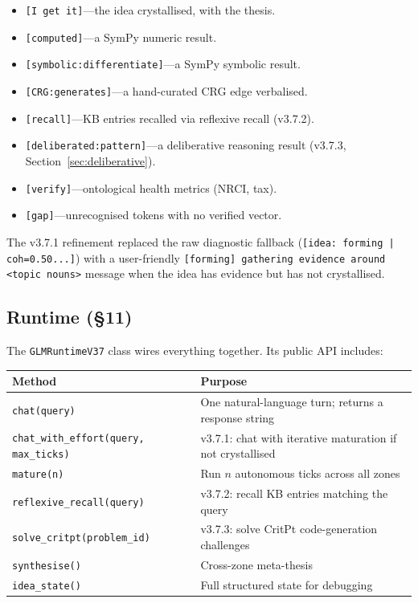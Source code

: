 \documentclass[11pt,a4paper]{article}
\begin{document}
\begin{itemize}
    \item \texttt{[I get it]}---the idea crystallised, with the thesis.
    \item \texttt{[computed]}---a SymPy numeric result.
    \item \texttt{[symbolic:differentiate]}---a SymPy symbolic result.
    \item \texttt{[CRG:generates]}---a hand-curated CRG edge verbalised.
    \item \texttt{[recall]}---KB entries recalled via reflexive recall (v3.7.2).
    \item \texttt{[deliberated:pattern]}---a deliberative reasoning result (v3.7.3, Section~\ref{sec:deliberative}).
    \item \texttt{[verify]}---ontological health metrics (NRCI, tax).
    \item \texttt{[gap]}---unrecognised tokens with no verified vector.
\end{itemize}

The v3.7.1 refinement replaced the raw diagnostic fallback (\texttt{[idea: forming | coh=0.50...]}) with a user-friendly \texttt{[forming] gathering evidence around <topic nouns>} message when the idea has evidence but has not crystallised.

\subsection{Runtime (\S11)}

The \texttt{GLMRuntimeV37} class wires everything together. Its public API includes:

\begin{center}
\begin{tabularx}{\textwidth}{lX}
\toprule
\textbf{Method} & \textbf{Purpose} \\
\midrule
\texttt{chat(query)} & One natural-language turn; returns a response string \\
\texttt{chat\_with\_effort(query, max\_ticks)} & v3.7.1: chat with iterative maturation if not crystallised \\
\texttt{mature(n)} & Run $n$ autonomous ticks across all zones \\
\texttt{reflexive\_recall(query)} & v3.7.2: recall KB entries matching the query \\
\texttt{solve\_critpt(problem\_id)} & v3.7.3: solve CritPt code-generation challenges \\
\texttt{synthesise()} & Cross-zone meta-thesis \\
\texttt{idea\_state()} & Full structured state for debugging \\
\bottomrule
\end{tabularx}
\end{center}
\end{document}
